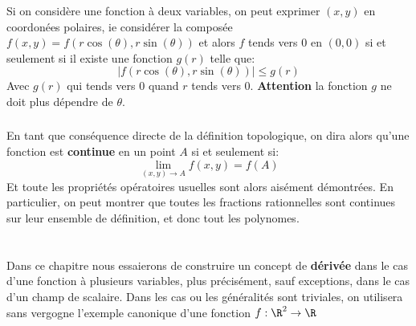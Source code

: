 \subsection*{}
Si on considère une fonction à deux variables, on peut exprimer \((x, y)\) en coordonées polaires, ie considérer la composée \(f(x, y) = f(r\cos(\theta), r\sin(\theta))\) et alors \(f\) tends vers \(0\) en \((0, 0)\) si et seulement si il existe une fonction \(g(r)\) telle que:
\[
   |f(r\cos(\theta), r\sin(\theta))| \leq g(r)
\]
Avec \(g(r)\) qui tends vers \(0\) quand \(r\) tends vers \(0\). \textbf{Attention} la fonction \(g\) ne doit plus dépendre de \(\theta\).
\subsection*{}
En tant que conséquence directe de la définition topologique, on dira alors qu'une fonction est \textbf{continue} en un point \(A\) si et seulement si:
\[
   \lim_{(x, y) \rightarrow A} f(x, y) = f(A)   
\]
Et toute les propriétés opératoires usuelles sont alors aisément démontrées. En particulier, on peut montrer que toutes les fractions rationnelles sont continues sur leur ensemble de définition, et donc tout les polynomes.

\chapter*{}
Dans ce chapitre nous essaierons de construire un concept de \textbf{dérivée} dans le cas d'une fonction à plusieurs variables, plus précisément, sauf exceptions, dans le cas d'un champ de scalaire. Dans les cas ou les généralités sont triviales, on utilisera sans vergogne l'exemple canonique d'une fonction \(f : \R^2 \rightarrow \R\)

